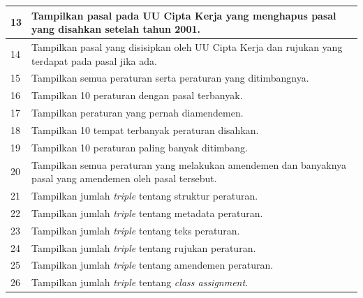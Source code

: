 \begin{longtable}[l]{|p{} | p{}|}
  13           & Tampilkan pasal pada UU Cipta Kerja yang menghapus pasal yang disahkan setelah tahun 2001.                                  \\ \hline
  14           & Tampilkan pasal yang disisipkan oleh UU Cipta Kerja dan rujukan yang terdapat pada pasal jika ada.                          \\ \hline
  15           & Tampilkan semua peraturan serta peraturan yang ditimbangnya.                                                                \\ \hline
  16           & Tampilkan 10 peraturan dengan pasal terbanyak.                                                                              \\ \hline
  17           & Tampilkan peraturan yang pernah diamendemen.                                                                                \\ \hline
  18           & Tampilkan 10 tempat terbanyak peraturan disahkan.                                                                           \\ \hline
  19           & Tampilkan 10 peraturan paling banyak ditimbang.                                                                             \\ \hline
  20           & Tampilkan semua peraturan yang melakukan amendemen dan banyaknya pasal yang amendemen oleh pasal tersebut.                  \\ \hline
  21           & Tampilkan jumlah \textit{triple} tentang struktur peraturan.                                                                \\ \hline
  22           & Tampilkan jumlah \textit{triple} tentang metadata peraturan.                                                                \\ \hline
  23           & Tampilkan jumlah \textit{triple} tentang teks peraturan.                                                                    \\ \hline
  24           & Tampilkan jumlah \textit{triple} tentang rujukan peraturan.                                                                 \\ \hline
  25           & Tampilkan jumlah \textit{triple} tentang amendemen peraturan.                                                               \\ \hline
  26           & Tampilkan jumlah \textit{triple} tentang \textit{class assignment}.                                                         \\ \hline

\end{longtable}
